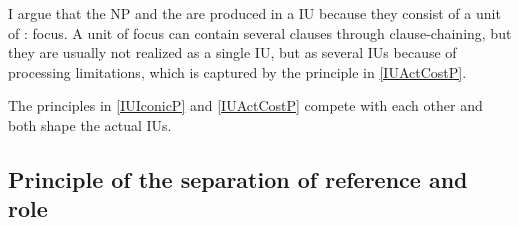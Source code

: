I argue that the NP and the  are produced in a  IU
because they consist of a unit of : focus.
A unit of focus can contain several clauses through clause-chaining,
but they are usually not realized as a single IU, but as several IUs
because of processing limitations,
which is captured by the principle in \ref{IUActCostP}.

The principles in \ref{IUIconicP} and \ref{IUActCostP} compete with each other and both shape the actual IUs.



\subsection{Principle of the separation of reference and role}

%
%
%
%

